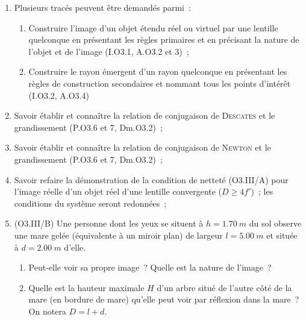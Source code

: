 \documentclass[a4paper, 12pt, final, garamond]{book}
\begin{document}
\begin{enumerate}[label=\sqenumi]
	\item Plusieurs tracés peuvent être demandés parmi~:
	      \begin{enumerate}
		      \item Construire l'image d'un objet étendu réel ou virtuel par une
		            lentille quelconque en présentant les règles primaires et en
		            précisant la nature de l'objet et de l'image (I.O3.1, A.O3.2 et
		            3)~;
		      \item Construire le rayon émergent d'un rayon quelconque en présentant
		            les règles de construction secondaires et nommant tous les points
		            d'intérêt (I.O3.2, A.O3.4)
	      \end{enumerate}

	\item Savoir établir et connaître la relation de conjugaison de
	      \textsc{Descates} et le grandissement (P.O3.6 et 7, Dm.O3.2)~;

	\item Savoir établir et connaître la relation de conjugaison de
	      \textsc{Newton} et le grandissement (P.O3.6 et 7, Dm.O3.2)~;

	\item Savoir refaire la démonstration de la condition de netteté (O3.III/A)
	      pour l'image réelle d'un objet réel d'une lentille convergente ($D \geq
		      4f'$)~; les conditions du système seront redonnées~;

	\item \leavevmode%
	      (O3.III/B) Une personne dont les yeux se situent à $h = \SI{1.70}{m}$ du
	      sol observe une mare gelée (équivalente à un miroir plan) de largeur $l
		      = \SI{5.00}{m}$ et située à $d = \SI{2.00}{m}$ d'elle.
	      \begin{enumerate}
		      \item Peut-elle voir sa propre image~? Quelle est la nature de
		            l'image~?
		      \item Quelle est la hauteur maximale $H$ d'un arbre situé de l'autre
		            côté de la mare (en bordure de mare) qu'elle peut voir par
		            réflexion dans la mare~? On notera $D = l+d$.
	      \end{enumerate}
\end{enumerate}
\end{document}
